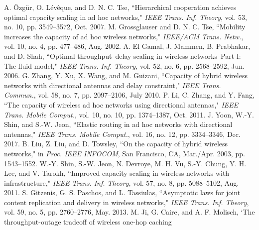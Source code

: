 \documentclass[10pt,journal,compsoc,onecolumn]{IEEEtran}
\begin{document}
\begin{thebibliography}{99}
 A. \"{O}zg\"{u}r, O. L\'{e}v\^{e}que, and D. N. C. Tse, ``Hierarchical cooperation achieves optimal capacity scaling in ad hoc networks," \emph{IEEE Trans. Inf. Theory}, vol. 53, no. 10, pp. 3549--3572, Oct. 2007.
 M. Grossglauser and D. N. C. Tse, ``Mobility increases the capacity of ad hoc wireless networks," \emph{IEEE/ACM Trans. Netw.}, vol. 10, no. 4, pp. 477--486, Aug. 2002.
A. El Gamal, J. Mammen, B. Prabhakar, and D. Shah, ``Optimal throughput--delay scaling in wireless networks--Part I: The fluid model," \emph{IEEE Trans. Inf. Theory}, vol. 52, no. 6, pp. 2568--2592, Jun. 2006.
 G. Zhang, Y. Xu, X. Wang, and M. Guizani, ``Capacity of hybrid wireless networks with directional antennas and delay constraint," \emph{IEEE Trans. Commun.}, vol. 58, no. 7, pp. 2097--2106, July 2010.
 P. Li, C. Zhang, and Y. Fang, ``The capacity of wireless ad hoc networks using directional antennas,"  \emph{IEEE Trans. Mobile Comput.}, vol. 10, no. 10, pp. 1374--1387, Oct. 2011.
 J. Yoon, W.-Y. Shin, and S.-W. Jeon, ``Elastic routing in ad hoc networks with directional antennas," {\em IEEE Trans. Mobile Comput.}, vol. 16, no. 12, pp. 3334--3346, Dec. 2017.
 B. Liu, Z. Liu, and D. Towsley, ``On the capacity of hybrid wireless networks," in \emph{Proc. IEEE INFOCOM}, San Francisco, CA, Mar./Apr. 2003, pp. 1543--1552.
 W.-Y. Shin, S.-W. Jeon, N. Devroye, M. H. Vu, S.-Y. Chung, Y. H. Lee, and V. Tarokh,  ``Improved capacity scaling in wireless networks with infrastructure," \emph{IEEE Trans. Inf. Theory}, vol. 57, no. 8, pp. 5088--5102, Aug. 2011.
S. Gitzenis, G. S. Paschos, and L. Tassiulas, ``Asymptotic laws for joint content replication and delivery in wireless networks," \emph{IEEE Trans. Inf. Theory}, vol. 59, no. 5, pp. 2760--2776, May. 2013.
 M. Ji, G. Caire, and A. F. Molisch, `The throughput-outage tradeoff of wireless one-hop caching

\end{thebibliography}
\end{document}
